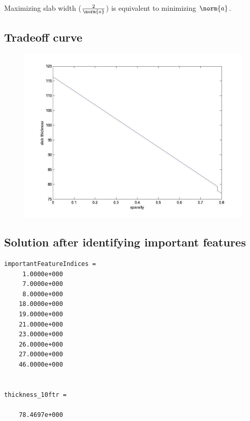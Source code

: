 \documentclass{article}
\begin{document}
Maximizing slab width ($\frac{2}{\norm{a}}$) is equivalent to minimizing $\norm{a}$.

\subsection{Tradeoff curve}
\begin{figure}
\includegraphics[scale=0.25]{code/sparseSeparation.jpg}
\end{figure}

\subsection{Solution after identifying important features}
\begin{lstlisting}
importantFeatureIndices =
     1.0000e+000
     7.0000e+000
     8.0000e+000
    18.0000e+000
    19.0000e+000
    21.0000e+000
    23.0000e+000
    26.0000e+000
    27.0000e+000
    46.0000e+000


thickness_10ftr =

    78.4697e+000

\end{lstlisting}


% 
% 
\end{document}

